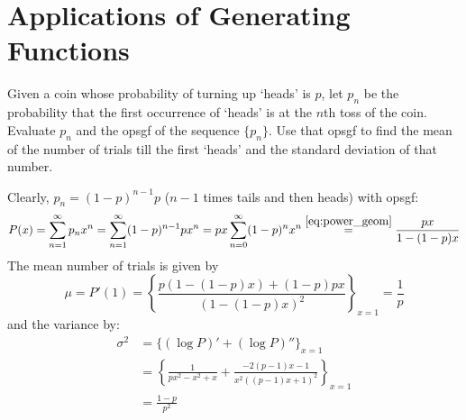 \section{Applications of Generating Functions}
\begin{exercise}
    Given a coin whose probability of turning up `heads' is $p$, let $p_n$ be the probability that the first occurrence of `heads' is at the $n$th toss of the coin. Evaluate $p_n$ and the opsgf of the sequence $\{p_n\}$. Use that opsgf to find the mean of the number of trials till the first `heads' and the standard deviation of that number.
\end{exercise}
\begin{solution}
    Clearly, $p_n = (1-p)^{n-1}p$ ($n-1$ times tails and then heads) with opsgf:
    \[
        P(x) = \sum_{n= 1}^\infty p_n x^n= \sum_{n=1}^\infty (1-p)^{n-1}p x^n = px \sum_{n=0}^\infty (1-p)^n x^n \overset{\eqref{eq:power_geom}}{=} \frac{px}{1-(1-p)x}
    \]
    The mean number of trials is given by 
    \[\mu = P'(1) = \left\{\frac{p(1-(1-p)x) + (1-p)px}{(1-(1-p)x)^2}\right\}_{x=1} = \frac{1}{p}\] and the variance by:
    \begin{align*}
        \sigma^2 &= \{(\log P)' + (\log P)''\}_{x=1} \\
        &= \left\{\frac{1}{px^2-x^2 + x} + \frac{-2(p-1)x-1}{x^2((p-1)x+1)^2}\right\}_{x=1} \\
        &= \frac{1-p}{p^2}
    \end{align*}
\end{solution}


